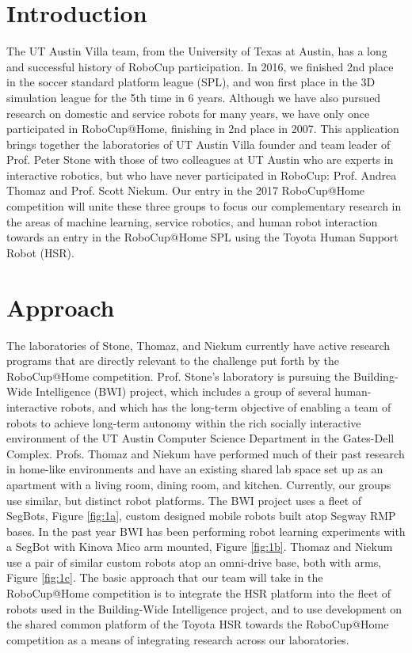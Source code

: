 \documentclass[runningheads,a4paper]{llncs}
\begin{document}

\section{Introduction}
The UT Austin Villa team, from the University of Texas at Austin, has a long and successful history of RoboCup participation. In 2016, we finished 2nd place in the soccer standard platform league (SPL), and won first place in the 3D simulation league for the 5th time in 6 years.  Although we have also pursued research on domestic and service robots for many years, we have only once participated in RoboCup@Home, finishing in 2nd place in 2007.  This application brings together the laboratories of UT Austin Villa founder and team leader of Prof. Peter Stone with those of two colleagues at UT Austin who are experts in interactive robotics, but who have never participated in RoboCup: Prof. Andrea Thomaz and Prof. Scott Niekum. Our entry in the 2017 RoboCup@Home competition will unite these three groups to focus our complementary research in the areas of machine learning, service robotics, and human robot interaction towards an entry in the RoboCup@Home SPL using the Toyota Human Support Robot (HSR).

\section{Approach}
The laboratories of Stone, Thomaz, and Niekum currently have active research programs that are directly relevant to the challenge put forth by the RoboCup@Home competition. Prof. Stone's laboratory is pursuing the Building-Wide Intelligence (BWI) project, which includes a group of several human-interactive robots, and which has the long-term objective of enabling a team of robots to achieve long-term autonomy within the rich socially interactive environment of the UT Austin Computer Science Department in the Gates-Dell Complex. Profs. Thomaz and Niekum have performed much of their past research in home-like environments and have an existing shared lab space set up as an apartment with a living room, dining room, and kitchen. Currently, our groups use similar, but distinct robot platforms. The BWI project uses a fleet of SegBots, Figure \ref{fig:1a}, custom designed mobile robots built atop Segway RMP bases. In the past year BWI has been performing robot learning experiments with a SegBot with Kinova Mico arm mounted, Figure \ref{fig:1b}. Thomaz and Niekum use a pair of similar custom robots atop an omni-drive base, both with arms, Figure \ref{fig:1c}. The basic approach that our team will take in the RoboCup@Home competition is to integrate the HSR platform into the fleet of robots used in the Building-Wide Intelligence project, and to use development on the shared common platform of the Toyota HSR towards the RoboCup@Home competition as a means of integrating research across our laboratories.
\end{document}
